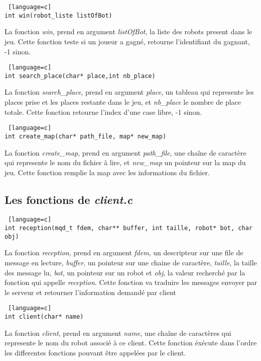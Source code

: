 \documentclass[a4paper, 11pt]{article}
\begin{document}
\begin {lstlisting} [language=c]
int win(robot_liste listOfBot)
\end{lstlisting}
La fonction \emph{win}, prend en argument \emph{listOfBot}, la liste des robots present dans le jeu. Cette fonction teste si un joueur a gagné, retourne l'identifiant du gagnant, -1 sinon.\\

\begin {lstlisting} [language=c]
int search_place(char* place,int nb_place)
\end{lstlisting}
La fonction \emph{search_place}, prend en argument \emph{place}, un tableau qui represente les places prise et les places restante dans le jeu, et \emph{nb_place} le nombre de place totale. Cette fonction retourne l'index d'une case libre, -1 sinon.\\

\begin {lstlisting} [language=c]
int create_map(char* path_file, map* new_map)
\end{lstlisting}
La fonction \emph{create_map}, prend en argument \emph{path_file}, une chaîne de caractère qui represente le nom du fichier à lire, et \emph{new_map} un pointeur sur la map du jeu. Cette fonction remplie la map avec les informations du fichier.\\

\subsection{Les fonctions de \emph{client.c}}
\begin {lstlisting} [language=c]
int reception(mqd_t fdem, char** buffer, int taille, robot* bot, char obj)
\end{lstlisting}
La fonction \emph{reception}, prend en argument \emph{fdem}, un descripteur sur une file de message en lecture, \emph{buffer}, un pointeur sur une chaine de caractère, \emph{taille}, la taille des message lu, \emph{bot}, un pointeur sur un robot et \emph{obj}, la valeur recherché par la fonction qui appelle \emph{reception}. Cette fonction va traduire les messages envoyer par le serveur et retourner l'information demandé par client\\

\begin {lstlisting} [language=c]
int client(char* name)
\end{lstlisting}
La fonction \emph{client}, prend en argument \emph{name}, une chaîne de caractères qui represente le nom du robot associé à ce client. Cette fonction éxécute dans l'ordre les differentes fonctions pouvant être appelées par le client.\\
\end{document}
